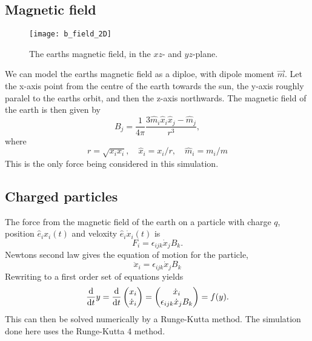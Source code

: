 \documentclass{article}
\begin{document}
        \subsection*{Magnetic field}

        \begin{figure}
            \centering     
            \texttt{[image: b\_field\_2D]}
            \caption{The earths magnetic field, in the $xz$- and $yz$-plane.  }
            \label{B-field}
        \end{figure}

        We can model the earths magnetic field as a diploe, with dipole moment $\vec m$. Let the x-axis point from the centre of the earth towards the sun, the y-axis roughly paralel to the earths orbit, and then the z-axis northwards. The magnetic field of the earth is then given by
            \begin{equation}
                B_j = \frac{1}{4\pi} \frac{3\hat m_i \hat x_i \hat x_j - \hat m_j}{r^3},
            \end{equation}
            where
            \begin{equation*}
                r = \sqrt{x_ix_i}, \quad \hat x_i = x_i / r, \quad \hat m_i = m_i/m
            \end{equation*}
        This is the only force being considered in this simulation.
        \subsection*{Charged particles}

            The force from the magnetic field of the earth on a particle with charge $q$, position $\hat e_i x_i(t)$ and veloxity $\hat e_i \dot x_i (t)$ is
            \begin{equation}
                F_i = \epsilon_{ijk} \dot x_j B_k.
            \end{equation}
            Newtons second law gives the equation of motion for the particle,
            \begin{equation}
                \ddot x_i = \epsilon_{ijk} \dot x_j B_k
            \end{equation}
            Rewriting to a first order set of equations yields
            \begin{align*}
                \dv{t} y = \dv{t} 
                \begin{pmatrix}
                    x_i \\
                    \dot x_i
                \end{pmatrix}
                = 
                \begin{pmatrix}
                    \dot x_i \\
                    \epsilon_{ijk} \dot x_j B_k
                \end{pmatrix}
                = f(y).
            \end{align*}
            This can then be solved numerically by a Runge-Kutta method. The simulation done here uses the Runge-Kutta 4 method.
        
\end{document}
